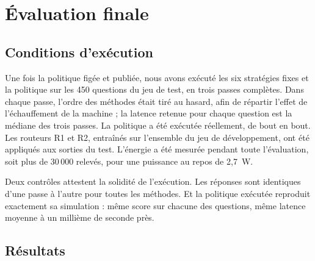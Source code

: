 \documentclass[11pt,a4paper]{article}
\begin{document}
\section{Évaluation finale}\label{sec:final}

\subsection{Conditions d'exécution}

Une fois la politique figée et publiée, nous avons exécuté les six stratégies fixes et la politique sur
les 450 questions du jeu de test, en trois passes complètes. Dans chaque passe, l'ordre des méthodes
était tiré au hasard, afin de répartir l'effet de l'échauffement de la machine ; la latence retenue pour
chaque question est la médiane des trois passes. La politique a été exécutée réellement, de bout en
bout. Les routeurs R1 et R2, entraînés sur l'ensemble du jeu de développement, ont été appliqués aux
sorties du test. L'énergie a été mesurée pendant toute l'évaluation, soit plus de 30\,000 relevés, pour
une puissance au repos de 2,7~W.

Deux contrôles attestent la solidité de l'exécution. Les réponses sont identiques d'une passe à l'autre
pour toutes les méthodes. Et la politique exécutée reproduit exactement sa simulation : même score sur
chacune des questions, même latence moyenne à un millième de seconde près.

\subsection{Résultats}
\end{document}
